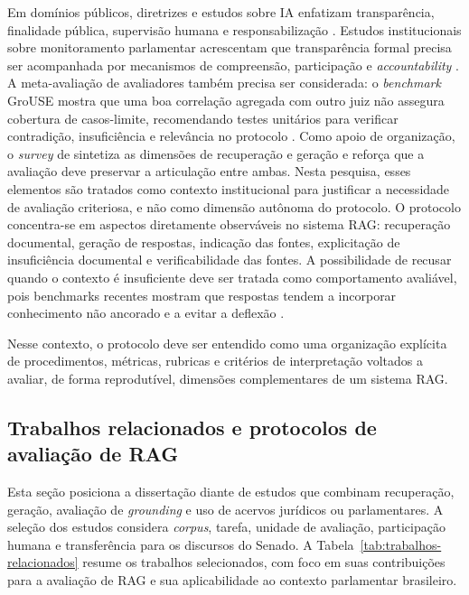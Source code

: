 Em domínios públicos, diretrizes e estudos sobre IA enfatizam transparência, finalidade pública, supervisão humana e responsabilização \parencite{ipu2024aiParliaments,wfd2023guidelinesAiParliaments,deAlmeidaSantos2025aiGovernance}. Estudos institucionais sobre monitoramento parlamentar acrescentam que transparência formal precisa ser acompanhada por mecanismos de compreensão, participação e \textit{accountability} \parencite{geunis2023parliamentaryMonitoring}. A meta-avaliação de avaliadores também precisa ser considerada: o \textit{benchmark} GroUSE mostra que uma boa correlação agregada com outro juiz não assegura cobertura de casos-limite, recomendando testes unitários para verificar contradição, insuficiência e relevância no protocolo \parencite{mullerEtAl2025grouse}. Como apoio de organização, o \textit{survey} de \textcite{yuEtAl2024ragEvaluationSurvey} sintetiza as dimensões de recuperação e geração e reforça que a avaliação deve preservar a articulação entre ambas. Nesta pesquisa, esses elementos são tratados como contexto institucional para justificar a necessidade de avaliação criteriosa, e não como dimensão autônoma do protocolo. O protocolo concentra-se em aspectos diretamente observáveis no sistema RAG: recuperação documental, geração de respostas, indicação das fontes, explicitação de insuficiência documental e verificabilidade das fontes. A possibilidade de recusar quando o contexto é insuficiente deve ser tratada como comportamento avaliável, pois benchmarks recentes mostram que respostas tendem a incorporar conhecimento não ancorado e a evitar a deflexão \parencite{sorodocEtAl2025garage}.

Nesse contexto, o protocolo deve ser entendido como uma organização explícita de procedimentos, métricas, rubricas e critérios de interpretação voltados a avaliar, de forma reprodutível, dimensões complementares de um sistema RAG.

\subsection{Trabalhos relacionados e protocolos de avaliação de RAG}

Esta seção posiciona a dissertação diante de estudos que combinam recuperação, geração, avaliação de \textit{grounding} e uso de acervos jurídicos ou parlamentares. A seleção dos estudos considera \textit{corpus}, tarefa, unidade de avaliação, participação humana e transferência para os discursos do Senado. A Tabela~\ref{tab:trabalhos-relacionados} resume os trabalhos selecionados, com foco em suas contribuições para a avaliação de RAG e sua aplicabilidade ao contexto parlamentar brasileiro. 

